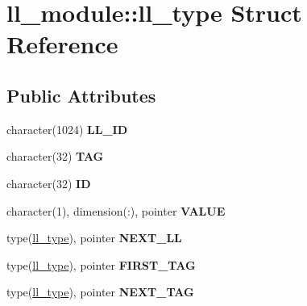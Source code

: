 \hypertarget{structll__module_1_1ll__type}{
\section{ll\_\-module::ll\_\-type Struct Reference}
\label{structll__module_1_1ll__type}
}
\subsection*{Public Attributes}
\begin{DoxyCompactItemize}
\item 
\hypertarget{structll__module_1_1ll__type_ab41ae5438b336cf921f22e2debc16ddc}{
character(1024) {\bfseries LL\_\-ID}}
\label{structll__module_1_1ll__type_ab41ae5438b336cf921f22e2debc16ddc}

\item 
\hypertarget{structll__module_1_1ll__type_a8707b4595b631153bd62317af472bd8c}{
character(32) {\bfseries TAG}}
\label{structll__module_1_1ll__type_a8707b4595b631153bd62317af472bd8c}

\item 
\hypertarget{structll__module_1_1ll__type_aa03b37bc0ebd7bd0fe46a38d88db0f6c}{
character(32) {\bfseries ID}}
\label{structll__module_1_1ll__type_aa03b37bc0ebd7bd0fe46a38d88db0f6c}

\item 
\hypertarget{structll__module_1_1ll__type_a804094732066d4c80b2e945c1e076114}{
character(1), dimension(:), pointer {\bfseries VALUE}}
\label{structll__module_1_1ll__type_a804094732066d4c80b2e945c1e076114}

\item 
\hypertarget{structll__module_1_1ll__type_a2a608e80978703de682f1f9dd99bcddb}{
type(\hyperlink{structll__module_1_1ll__type}{ll\_\-type}), pointer {\bfseries NEXT\_\-LL}}
\label{structll__module_1_1ll__type_a2a608e80978703de682f1f9dd99bcddb}

\item 
\hypertarget{structll__module_1_1ll__type_a0b48f7ee7f3bfed75e43da6622dc587f}{
type(\hyperlink{structll__module_1_1ll__type}{ll\_\-type}), pointer {\bfseries FIRST\_\-TAG}}
\label{structll__module_1_1ll__type_a0b48f7ee7f3bfed75e43da6622dc587f}

\item 
\hypertarget{structll__module_1_1ll__type_ad8dcb7075a087e3683a2e99646c9db76}{
type(\hyperlink{structll__module_1_1ll__type}{ll\_\-type}), pointer {\bfseries NEXT\_\-TAG}}
\label{structll__module_1_1ll__type_ad8dcb7075a087e3683a2e99646c9db76}


\end{DoxyCompactItemize}
